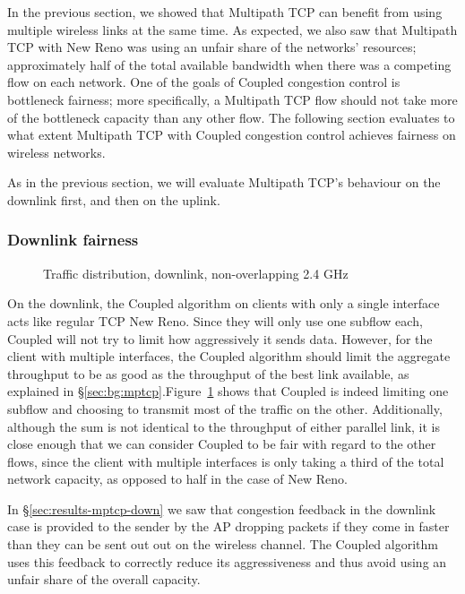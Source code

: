 In the previous section, we showed that Multipath TCP can benefit from
using multiple wireless links at the same time. As expected, we also saw that
Multipath TCP with New Reno was using an unfair share of the networks'
resources; approximately half of the total available bandwidth when there was a
competing flow on each network. One of the goals of Coupled congestion 
control is bottleneck fairness; more specifically, a 
Multipath TCP flow should not take more of the bottleneck capacity than any 
other flow. The following section evaluates to what extent Multipath TCP with 
Coupled congestion control achieves fairness on wireless networks.

As in the previous section, we will evaluate Multipath TCP's behaviour on the
downlink first, and then on the uplink.

\subsubsection{Downlink fairness}

\begin{figure}[h]
 \centering
 
 \caption{Traffic distribution, downlink, non-overlapping 2.4 GHz}\label{graph:down-fair}
\end{figure}

On the downlink, the Coupled algorithm on clients with only a single
interface acts like regular TCP New Reno. Since they will only use one subflow
each, Coupled will not try to limit how aggressively it sends data. However, for
the client with multiple interfaces, the Coupled algorithm should limit the
aggregate throughput to be as good as the throughput of the best link
available, as explained in \S\ref{sec:bg:mptcp}.\@ Figure~\ref{graph:down-fair}
shows that Coupled is indeed limiting one subflow and choosing to transmit most
of the traffic on the other.  Additionally, although the sum is not identical to
the throughput of either parallel link, it is close enough that we can consider
Coupled to be fair with regard to the other flows, since the
client with multiple interfaces is only taking a third of the total network
capacity, as opposed to half in the case of New Reno.


In \S\ref{sec:results-mptcp-down} we saw that congestion feedback in the 
downlink case is provided to the sender by the AP dropping packets if they
come in faster than they can be sent out out on the wireless channel. The
Coupled algorithm uses this feedback to correctly reduce its aggressiveness and 
thus avoid using an unfair share of the overall capacity.

